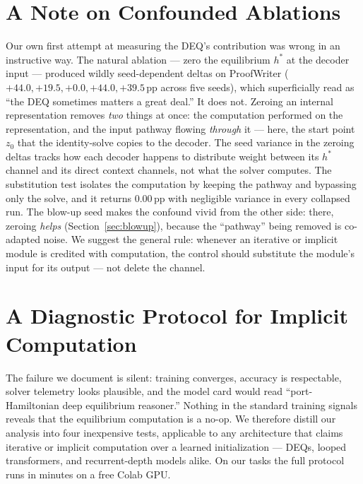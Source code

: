 \documentclass[11pt]{article}
\newcommand{\hstar}{h^{*}}
\newcommand{\zzero}{z_{0}}
\begin{document}
\section{A Note on Confounded Ablations}\label{sec:confound}
Our own first attempt at measuring the DEQ's contribution was wrong in
an instructive way. The natural ablation --- zero the equilibrium
$\hstar$ at the decoder input --- produced wildly seed-dependent
deltas on ProofWriter ($+44.0, +19.5, +0.0, +44.0, +39.5$\,pp across
five seeds), which superficially read as ``the DEQ sometimes matters
a great deal.'' It does not. Zeroing an internal representation
removes \emph{two} things at once: the computation performed on the
representation, and the input pathway flowing \emph{through} it ---
here, the start point $\zzero$ that the identity-solve copies to the
decoder. The seed variance in the zeroing deltas tracks how each
decoder happens to distribute weight between its $\hstar$ channel and
its direct context channels, not what the solver computes. The
substitution test isolates the computation by keeping the pathway and
bypassing only the solve, and it returns $0.00$\,pp with negligible
variance in every collapsed run. The blow-up seed makes the confound
vivid from the other side: there, zeroing \emph{helps}
(Section~\ref{sec:blowup}), because the ``pathway'' being removed is
co-adapted noise. We suggest the general rule: whenever an iterative
or implicit module is credited with computation, the control should
substitute the module's input for its output --- not delete the
channel.

\section{A Diagnostic Protocol for Implicit Computation}\label{sec:protocol}
The failure we document is silent: training converges, accuracy is
respectable, solver telemetry looks plausible, and the model card
would read ``port-Hamiltonian deep equilibrium reasoner.'' Nothing in
the standard training signals reveals that the equilibrium computation
is a no-op. We therefore distill our analysis into four inexpensive
tests, applicable to any architecture that claims iterative or
implicit computation over a learned initialization --- DEQs, looped
transformers, and recurrent-depth models alike. On our tasks the full
protocol runs in minutes on a free Colab GPU.
\end{document}
